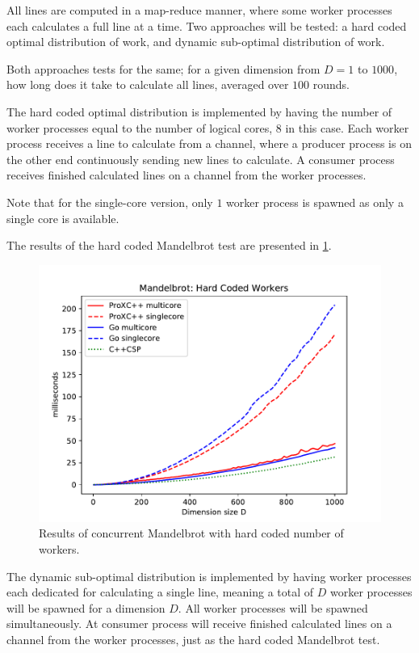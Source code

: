 All lines are computed in a map\hyp{}reduce manner, where some worker processes each calculates a full line at a time. Two approaches will be tested: a hard coded optimal distribution of work, and dynamic sub\hyp{}optimal distribution of work.

Both approaches tests for the same; for a given dimension from $D=1$ to $1000$, how long does it take to calculate all lines, averaged over $100$ rounds. 

The hard coded optimal distribution is implemented by having the number of worker processes equal to the number of logical cores, $8$ in this case. Each worker process receives a line to calculate from a channel, where a producer process is on the other end continuously sending new lines to calculate. A consumer process receives finished calculated lines on a channel from the worker processes.

Note that for the single\hyp{}core version, only $1$ worker process is spawned as only a single core is available.

The results of the hard coded Mandelbrot test are presented in \cref{fig:mandelbrot_hardcoded}.

\begin{figure}[h!]
    \centering
    \includegraphics[width=0.9\linewidth]{fig/mandelbrot_hardcoded}
    \caption{Results of concurrent Mandelbrot with hard coded number of workers.}
    \label{fig:mandelbrot_hardcoded}
\end{figure}

The dynamic sub-optimal distribution is implemented by having worker processes each dedicated for calculating a single line, meaning a total of $D$ worker processes will be spawned for a dimension $D$. All worker processes will be spawned simultaneously. At consumer process will receive finished calculated lines on a channel from the worker processes, just as the hard coded Mandelbrot test.

